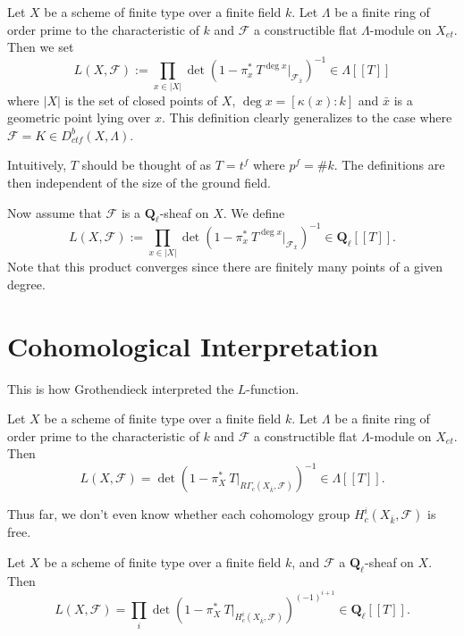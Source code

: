 \begin{definition}
Let $X$ be a scheme of finite type over a finite field $k$. Let $\Lambda$ be a 
finite ring of order prime to the characteristic of $k$ and $\mathcal{F}$ a 
constructible flat $\Lambda$-module on $X_{et}$. Then we set
$$
L(X, \mathcal{F}) := \prod_{x\in |X|}\det\left(1-\pi_x^*\ T^{\deg 
x}\Big|_{\mathcal{F}_{\bar x}}\right)^{-1}\in \Lambda [[ T ]]
$$
where $|X|$ is the set of closed points of $X$, $\deg x = [\kappa(x): k]$ and 
$\bar x$ is a geometric point lying over $x$. This definition clearly 
generalizes to the case where $\mathcal{F} =K \in D_{ctf}^b(X, \Lambda)$. 

\begin{remark}
Intuitively, $T$ should be thought of as $T = t^f$ where $p^f = \# k$. The 
definitions are then independent of the size of the ground field.
\end{remark}

Now assume that $\mathcal{F}$ is a $\mathbf{Q}_\ell$-sheaf on $X$. We define
$$
L(X, \mathcal{F}) := \prod_{x\in |X|}\det\left(1-\pi_x^*\ T^{\deg 
x}\Big|_{\mathcal{F}_{\bar x}}\right)^{-1}\in \mathbf{Q}_\ell [[ T ]].
$$
Note that this product converges since there are finitely many points of a 
given degree.
\end{definition}

\section{Cohomological Interpretation} 

This is how Grothendieck interpreted the $L$-function.

\begin{theorem} \label{thmA} 
Let $X$ be a scheme of finite type over a finite field $k$. Let $\Lambda$ be a 
finite ring of order prime to the characteristic of $k$ and $\mathcal{F}$ a 
constructible flat $\Lambda$-module on $X_{et}$. Then
$$
L(X, \mathcal{F}) = \det\left(1-\pi_X^*\ T\Big|_{R\Gamma_c(X_{\bar k}, 
\mathcal{F})}\right)^{-1}\in \Lambda[[ T]].
$$
\end{theorem}

Thus far, we don't even know whether each cohomology group $H^i_c(X_{\bar k}, 
\mathcal{F})$ is free.

\begin{theorem} \label{thmB} 
Let $X$ be a scheme of finite type over a finite field $k$, and $\mathcal{F}$ a 
$\mathbf{Q}_\ell$-sheaf on $X$. Then
$$
L(X, \mathcal{F}) = \prod_i \det\left(1-\pi_X^*\ 
T\Big|_{H_c^i\left(X_{\bar k} , \mathcal{F}\right)}\right)^{(-1)^{i+1}}
\in \mathbf{Q}_\ell[[ T]]. 
$$
\end{theorem}

